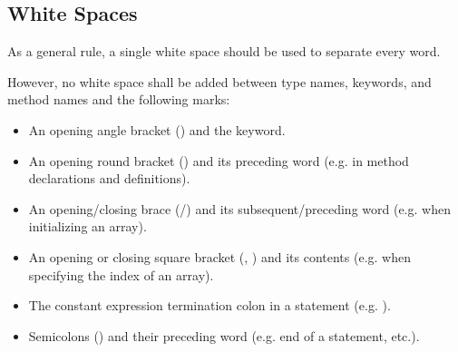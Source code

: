 \subsection{White Spaces}
\label{subsec:WhiteSpaces}

As a general rule, a single white space should be used to separate every word.

However, no white space shall be added between type names, keywords, and method
names and the following marks:
\begin{itemize}
\item An opening angle bracket (\code{<}) and the  keyword.
\item An opening round bracket (\code{(}) and its preceding word (e.g. in method
declarations and definitions).
\item An opening/closing brace (\code{\{}/\code{\}}) and its
subsequent/preceding word (e.g. when initializing an array).
\item An opening or closing square bracket (\code{[}, \code{]} ) and its
contents (e.g. when specifying the index of an array).
\item The constant expression termination colon in a  statement
(e.g. ).
\item Semicolons (\code{;}) and their preceding word (e.g. end of a statement,
etc.).
\end{itemize}

